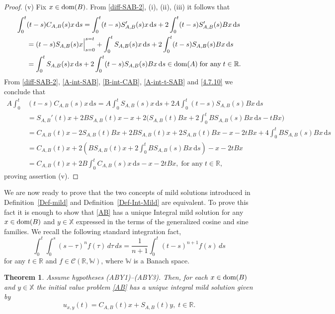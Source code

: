 \documentclass[11pt]{amsart}
\numberwithin{equation}{section}
\newcommand{\SAB}{S_{A,B}}
\newcommand{\CAB}{C_{A,B}}
\newcommand{\rmd}{{\mathrm{d}}}
\newtheorem{theorem}{Theorem}[section]
\theoremstyle{remark}
\theoremstyle{definition}
\newcommand\bW{{\mathbb W}}
\newcommand\bX{{\mathbb X}}
\newcommand{\dom}{\text{\rm{dom}}}
\begin{document}
\begin{proof}
	
	(v) Fix $x \in \dom(B)$. From \eqref{diff-SAB-2}, (i), (ii), (iii) it follows that
	\begin{align}\label{4.7.10}
		\int_0^t &(t-s)\CAB(s)x \, \rmd s
		= \int_0^t (t-s)\SAB'(s)x \, \rmd s + 2\int_0^t (t-s)\SAB'(s)Bx \, \rmd s\nonumber\\
		&= (t-s)\SAB(s)x \Big|_{s=0}^{s=t}+\int_0^t \SAB(s)x \, \rmd s
		+ 2\int_0^t (t-s)\SAB(s)Bx \, \rmd s\nonumber\\
		&=\int_0^t \SAB(s)x \, \rmd s
		+ 2\int_0^t (t-s)\SAB(s)Bx \, \rmd s
		\in \dom(A) \; \text{for any}\; t \in \mathbb{R}.
	\end{align}
	From \eqref{diff-SAB-2}, \eqref{A-int-SAB}, \eqref{B-int-CAB}, \eqref{A-int-t-SAB} and  \eqref{4.7.10} we conclude that
	\begin{align*}
		A\int_0^t &(t-s)\CAB(s)x \, \rmd s
		= A\int_0^t \SAB(s)x \, \rmd s + 2A\int_0^t (t-s)\SAB(s)Bx \, \rmd s \nonumber\\
		&= \SAB'(t)x + 2B\SAB(t)x - x
		+ 2\bigl(\SAB(t)Bx + 2\int_0^t B\SAB(s)Bx \, \rmd s - tBx\bigr) \nonumber\\
		&= \CAB(t)x - 2\SAB(t)Bx + 2B\SAB(t)x
		+ 2\SAB(t)Bx - x - 2tBx
		+ 4\int_0^t B\SAB(s)Bx \, \rmd s \nonumber\\
		&= \CAB(t)x + 2\!\left(B\SAB(t)x + 2\int_0^t B\SAB(s)Bx \, \rmd s\right) - x - 2tBx \nonumber\\
		&= \CAB(t)x + 2B\int_0^t \CAB(s)x \, \rmd s - x - 2tBx, \;\text{for any}\; t \in \mathbb{R},
	\end{align*}
	proving assertion (v).
\end{proof}
We are now ready to prove that the two concepts of mild solutions introduced in Definition~\ref{Def-mild} and Definition~\ref{Def-Int-Mild} are equivalent. To prove this fact it is enough to show that \eqref{AB} has a unique Integral mild solution for any $x\in\dom(B)$ and $y\in\bX$ expressed in the terms of the generalized cosine and sine families. 
We recall the following standard integration fact,
\begin{equation}\label{integral-transform}
	\int_0^t \!\int_0^s (s-\tau)^n f(\tau)\,d\tau\,ds
	= \frac{1}{n+1} \int_0^t (t-s)^{n+1} f(s)\,ds
\end{equation}
for any $t \in \mathbb{R}$ and $f \in \mathcal{C}(\mathbb{R}, \bW)$, where $\bW$ is a Banach space.
\begin{theorem}\label{t4.8}
	Assume hypotheses \textnormal{(ABY1)--(ABY3)}. Then, for each $x \in \dom(B)$ and $y \in\bX$ the initial value problem \eqref{AB} has a unique integral mild solution given by
	\begin{equation}\label{Integral-Mild-C-S-AB}
		u_{x,y}(t) = \CAB(t)x + \SAB(t)y, \; t \in \mathbb{R}.
	\end{equation}
\end{theorem}
\end{document}
